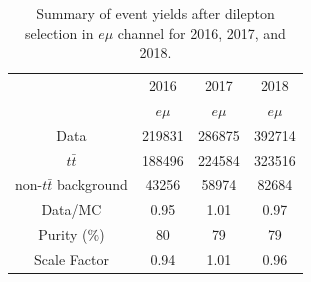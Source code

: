 \documentclass{cernatlasnote}
\begin{document}
\begin{table}[htp]%
  \caption{Summary of event yields after dilepton selection in $e\mu$ channel for 2016, 2017, and 2018.}
\begin{center}
 \begin{tabular}{|c|c|c|c|} \hline
                  &  2016       &2017         &2018 \\
                  & $e\mu$    & $e\mu$     &  $e\mu$\\\hline
Data             & 219831         & 286875       & 392714 \\\hline
 $t\bar{t}$     & 188496         &  224584      & 323516  \\ \hline
non-$t\bar{t}$ background & 43256   &  58974    & 82684 \\ \hline
Data/MC           &0.95     & 1.01   &0.97  \\ \hline
Purity ($\%$)       & 80       &   79     &  79   \\ \hline
Scale Factor       & 0.94      & 1.01      & 0.96 \\\hline
\end{tabular}
\end{center}
\label{tab:eventyieldfullRun2_incl}
\end{table}
\end{document}
